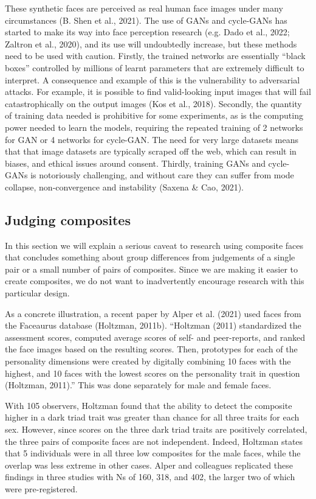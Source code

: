 \documentclass[
  doc,floatsintext]{apa6}
\begin{document}
These synthetic faces are perceived as real human face images under many circumstances (B. Shen et al., 2021). The use of GANs and cycle-GANs has started to make its way into face perception research (e.g. Dado et al., 2022; Zaltron et al., 2020), and its use will undoubtedly increase, but these methods need to be used with caution. Firstly, the trained networks are essentially ``black boxes'' controlled by millions of learnt parameters that are extremely difficult to interpret. A consequence and example of this is the vulnerability to adversarial attacks. For example, it is possible to find valid-looking input images that will fail catastrophically on the output images (Kos et al., 2018). Secondly, the quantity of training data needed is prohibitive for some experiments, as is the computing power needed to learn the models, requiring the repeated training of 2 networks for GAN or 4 networks for cycle-GAN. The need for very large datasets means that that image datasets are typically scraped off the web, which can result in biases, and ethical issues around consent. Thirdly, training GANs and cycle-GANs is notoriously challenging, and without care they can suffer from mode collapse, non-convergence and instability (Saxena \& Cao, 2021).

\hypertarget{judging-composites}{%
\subsection{Judging composites}\label{judging-composites}}

In this section we will explain a serious caveat to research using composite faces that concludes something about group differences from judgements of a single pair or a small number of pairs of composites. Since we are making it easier to create composites, we do not want to inadvertently encourage research with this particular design.

As a concrete illustration, a recent paper by Alper et al. (2021) used faces from the Faceaurus database (Holtzman, 2011b). ``Holtzman (2011) standardized the assessment scores, computed average scores of self- and peer-reports, and ranked the face images based on the resulting scores. Then, prototypes for each of the personality dimensions were created by digitally combining 10 faces with the highest, and 10 faces with the lowest scores on the personality trait in question (Holtzman, 2011).'' This was done separately for male and female faces.

With 105 observers, Holtzman found that the ability to detect the composite higher in a dark triad trait was greater than chance for all three traits for each sex. However, since scores on the three dark triad traits are positively correlated, the three pairs of composite faces are not independent. Indeed, Holtzman states that 5 individuals were in all three low composites for the male faces, while the overlap was less extreme in other cases. Alper and colleagues replicated these findings in three studies with Ns of 160, 318, and 402, the larger two of which were pre-registered.
\end{document}
